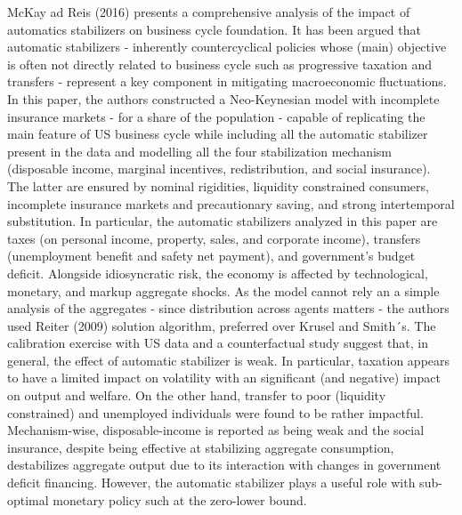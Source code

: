 \documentclass[12pt,a4paper]{article}
\begin{document}
McKay ad Reis (2016) presents a comprehensive analysis of the impact of automatics stabilizers on business cycle foundation. It has  been argued that automatic stabilizers - inherently countercyclical policies whose (main) objective is often not directly related to business cycle such as progressive taxation and transfers - represent a key component in mitigating macroeconomic fluctuations. In this paper, the authors constructed a Neo-Keynesian model with incomplete insurance markets - for a share of the population - capable of replicating the main feature of US business cycle while including all the automatic stabilizer present in the data and modelling all the four stabilization mechanism (disposable income, marginal incentives, redistribution, and social insurance). The latter are ensured by nominal rigidities, liquidity constrained consumers, incomplete insurance markets and precautionary saving, and strong intertemporal substitution. In particular, the automatic stabilizers analyzed in this paper are taxes (on personal income, property, sales, and corporate income), transfers (unemployment benefit and safety net payment), and government's budget deficit. Alongside idiosyncratic risk, the economy is affected by technological, monetary, and markup aggregate shocks. As the model cannot rely an a simple analysis of the aggregates - since distribution across agents matters - the authors used Reiter (2009) solution algorithm, preferred over Krusel and Smith´s. The calibration exercise with US data and a counterfactual study suggest that, in general, the effect of automatic stabilizer is weak. In particular, taxation appears to have a limited impact on volatility with an significant (and negative) impact on output and welfare. On the other hand, transfer to poor (liquidity constrained) and unemployed individuals were found to be rather impactful. Mechanism-wise, disposable-income is reported as being weak and the social insurance, despite being effective at stabilizing aggregate consumption, destabilizes aggregate output due to its interaction with changes in government deficit financing. However, the automatic stabilizer plays a useful role with sub-optimal monetary policy such at the zero-lower bound.

%
\pagebreak
\end{document}
